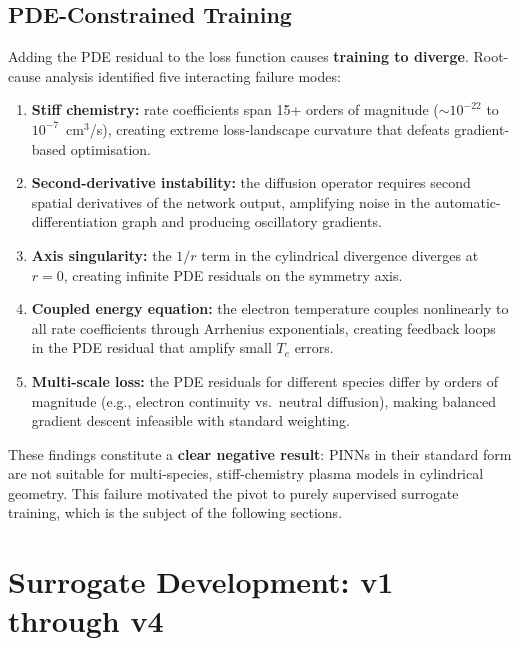 \documentclass[12pt,a4paper]{article}
\begin{document}
\subsection{PDE-Constrained Training}

Adding the PDE residual to the loss function causes \textbf{training
to diverge}.  Root-cause analysis identified five interacting failure
modes:

\begin{enumerate}
  \item \textbf{Stiff chemistry:} rate coefficients span 15+ orders
        of magnitude ($\sim 10^{-22}$ to $10^{-7}$~cm$^3$/s),
        creating extreme loss-landscape curvature that defeats
        gradient-based optimisation.
  \item \textbf{Second-derivative instability:} the diffusion operator
        requires second spatial derivatives of the network output,
        amplifying noise in the automatic-differentiation graph and
        producing oscillatory gradients.
  \item \textbf{Axis singularity:} the $1/r$ term in the cylindrical
        divergence diverges at $r = 0$, creating infinite PDE
        residuals on the symmetry axis.
  \item \textbf{Coupled energy equation:} the electron temperature
        couples nonlinearly to all rate coefficients through
        Arrhenius exponentials, creating feedback loops in the PDE
        residual that amplify small $T_e$ errors.
  \item \textbf{Multi-scale loss:} the PDE residuals for different
        species differ by orders of magnitude (e.g., electron
        continuity vs.\ neutral diffusion), making balanced
        gradient descent infeasible with standard weighting.
\end{enumerate}

These findings constitute a \textbf{clear negative result}: PINNs in
their standard form are not suitable for multi-species,
stiff-chemistry plasma models in cylindrical geometry.  This failure
motivated the pivot to purely supervised surrogate training, which is
the subject of the following sections.

\section{Surrogate Development: v1 through v4}
\label{sec:surrogate}
\end{document}
